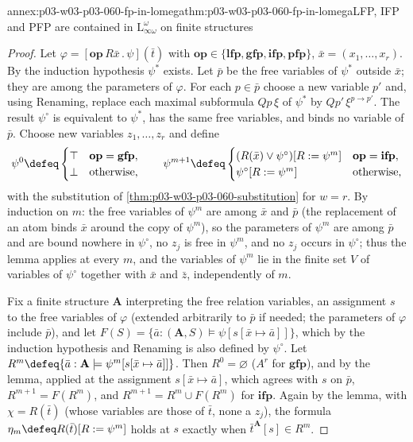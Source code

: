 \begin{annexitem}{annex:p03-w03-p03-060-fp-in-lomega}{thm:p03-w03-p03-060-fp-in-lomega}{LFP, IFP and PFP are contained in \(\mathrm{L}^\omega_{\infty\omega}\) on finite structures}
\begin{proof}
Let \(\varphi=[\mathbf{op}\,R\bar x\,.\,\psi](\bar t)\) with
\(\mathbf{op}\in\{\mathbf{lfp},\mathbf{gfp},\mathbf{ifp},\mathbf{pfp}\}\),
\(\bar x=(x_1,\ldots,x_r)\). By the induction hypothesis \(\psi^\ast\)
exists. Let \(\bar p\) be the free variables of \(\psi^\ast\) outside
\(\bar x\); they are among the parameters of \(\varphi\). For each
\(p\in\bar p\) choose a new variable \(p'\) and, using Renaming, replace
each maximal subformula \(Qp\,\xi\) of \(\psi^\ast\) by
\(Qp'\,\xi^{p\to p'}\). The result \(\psi^\circ\) is equivalent to
\(\psi^\ast\), has the same free variables, and binds no variable of
\(\bar p\). Choose new variables \(z_1,\ldots,z_r\) and define
\[
 \psi^0\defeq\begin{cases}\top&\mathbf{op}=\mathbf{gfp},\\ \bot&\text{otherwise,}\end{cases}
 \qquad
 \psi^{m+1}\defeq\begin{cases}
 (R(\bar x)\vee\psi^\circ)[R:=\psi^m]&\mathbf{op}=\mathbf{ifp},\\
 \psi^\circ[R:=\psi^m]&\text{otherwise,}\end{cases}
\]
with the substitution of \cref{thm:p03-w03-p03-060-substitution} for
\(w=r\). By induction on \(m\): the free variables of \(\psi^m\) are among
\(\bar x\) and \(\bar p\) (the replacement of an atom binds \(\bar x\)
around the copy of \(\psi^m\)), so the parameters of \(\psi^m\) are among
\(\bar p\) and are bound nowhere in \(\psi^\circ\), no \(z_j\) is free in
\(\psi^m\), and no \(z_j\) occurs in \(\psi^\circ\); thus the lemma
applies at every \(m\), and the variables of \(\psi^m\) lie in the finite
set \(V\) of variables of \(\psi^\circ\) together with \(\bar x\) and
\(\bar z\), independently of \(m\).

Fix a finite structure \(\mathbf A\) interpreting the free relation
variables, an assignment \(s\) to the free variables of \(\varphi\)
(extended arbitrarily to \(\bar p\) if needed; the parameters of
\(\varphi\) include \(\bar p\)), and let
\(F(S)=\{\bar a:(\mathbf A,S)\models\psi[s[\bar x\mapsto\bar a]]\}\), which
by the induction hypothesis and Renaming is also defined by \(\psi^\circ\).
Let \(R^m\defeq\{\bar a:\mathbf A\models\psi^m[s[\bar x\mapsto\bar a]]\}\).
Then \(R^0=\varnothing\) (\(A^r\) for \(\mathbf{gfp}\)), and by the lemma,
applied at the assignment \(s[\bar x\mapsto\bar a]\), which agrees with
\(s\) on \(\bar p\), \(R^{m+1}=F(R^m)\), and
\(R^{m+1}=R^m\cup F(R^m)\) for \(\mathbf{ifp}\). Again by the lemma, with
\(\chi=R(\bar t)\) (whose variables are those of \(\bar t\), none a
\(z_j\)), the formula \(\eta_m\defeq R(\bar t)[R:=\psi^m]\) holds at \(s\)
exactly when \(\bar t^{\mathbf A}[s]\in R^m\).


\end{proof}
\end{annexitem}
